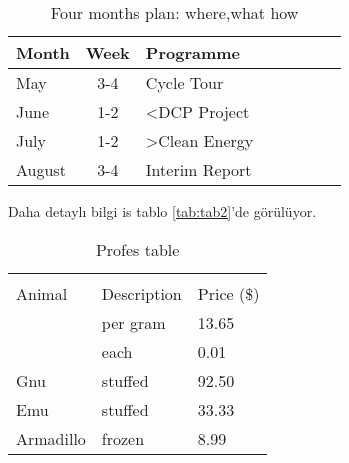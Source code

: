 \begin{table}[H]
\renewcommand{\arraystretch}{1.3}
\begin{tabular}{lclclclc}
\hline
\hline 
Month & Week & Programme \\
\hline
May & 3-4 & Cycle Tour \\
June & 1-2 & \textless DCP Project\\
July & 1-2 & \textgreater Clean Energy\\
August & 3-4 & Interim Report\\
\hline
\end{tabular}
\caption{Four months plan: where,what how}
\label{tab:tab1}
\end{table}
\newpage
Daha detaylı bilgi is tablo \ref{tab:tab2}'de görülüyor.
\begin{mycode}
  \begin{table}[H]
  	\renewcommand{\arraystretch}{1.3}
  	\begin{tabular}{l C{3cm} C{3cm}}
       	\toprule
            	&    \\
         \cmidrule(r){2-3}
            	Animal  & Description & Price  (\$) \\ 
         \midrule
            	 & per gram    & 13.65    \\
            	& each        & 0.01                           \\
            	Gnu              & stuffed     & 92.50  \\
            	Emu                                 & stuffed     & 33.33     \\
            	Armadillo                           & frozen      & 8.99  \\ 
          \bottomrule
  	\end{tabular}
  	\caption{Profes table}
  	\label{tab:tabP}
  \end{table}
\end{mycode}

